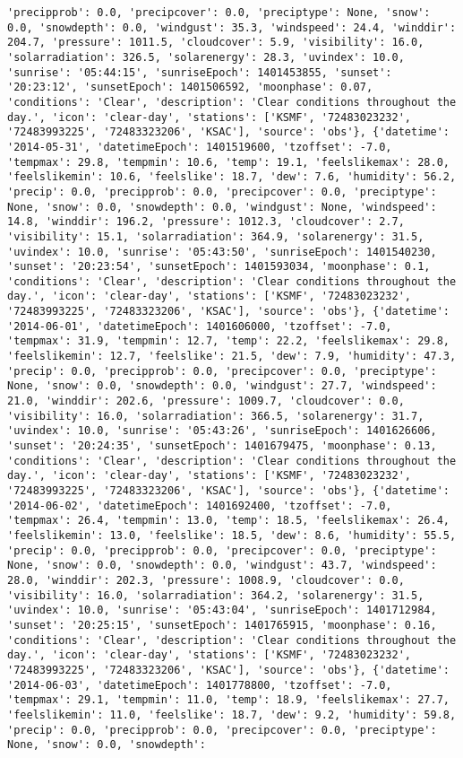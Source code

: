 \documentclass[
  letterpaper,
  DIV=11,
  numbers=noendperiod]{scrartcl}
\begin{document}
\begin{verbatim}
'precipprob': 0.0, 'precipcover': 0.0, 'preciptype': None, 'snow': 0.0, 'snowdepth': 0.0, 'windgust': 35.3, 'windspeed': 24.4, 'winddir': 204.7, 'pressure': 1011.5, 'cloudcover': 5.9, 'visibility': 16.0, 'solarradiation': 326.5, 'solarenergy': 28.3, 'uvindex': 10.0, 'sunrise': '05:44:15', 'sunriseEpoch': 1401453855, 'sunset': '20:23:12', 'sunsetEpoch': 1401506592, 'moonphase': 0.07, 'conditions': 'Clear', 'description': 'Clear conditions throughout the day.', 'icon': 'clear-day', 'stations': ['KSMF', '72483023232', '72483993225', '72483323206', 'KSAC'], 'source': 'obs'}, {'datetime': '2014-05-31', 'datetimeEpoch': 1401519600, 'tzoffset': -7.0, 'tempmax': 29.8, 'tempmin': 10.6, 'temp': 19.1, 'feelslikemax': 28.0, 'feelslikemin': 10.6, 'feelslike': 18.7, 'dew': 7.6, 'humidity': 56.2, 'precip': 0.0, 'precipprob': 0.0, 'precipcover': 0.0, 'preciptype': None, 'snow': 0.0, 'snowdepth': 0.0, 'windgust': None, 'windspeed': 14.8, 'winddir': 196.2, 'pressure': 1012.3, 'cloudcover': 2.7, 'visibility': 15.1, 'solarradiation': 364.9, 'solarenergy': 31.5, 'uvindex': 10.0, 'sunrise': '05:43:50', 'sunriseEpoch': 1401540230, 'sunset': '20:23:54', 'sunsetEpoch': 1401593034, 'moonphase': 0.1, 'conditions': 'Clear', 'description': 'Clear conditions throughout the day.', 'icon': 'clear-day', 'stations': ['KSMF', '72483023232', '72483993225', '72483323206', 'KSAC'], 'source': 'obs'}, {'datetime': '2014-06-01', 'datetimeEpoch': 1401606000, 'tzoffset': -7.0, 'tempmax': 31.9, 'tempmin': 12.7, 'temp': 22.2, 'feelslikemax': 29.8, 'feelslikemin': 12.7, 'feelslike': 21.5, 'dew': 7.9, 'humidity': 47.3, 'precip': 0.0, 'precipprob': 0.0, 'precipcover': 0.0, 'preciptype': None, 'snow': 0.0, 'snowdepth': 0.0, 'windgust': 27.7, 'windspeed': 21.0, 'winddir': 202.6, 'pressure': 1009.7, 'cloudcover': 0.0, 'visibility': 16.0, 'solarradiation': 366.5, 'solarenergy': 31.7, 'uvindex': 10.0, 'sunrise': '05:43:26', 'sunriseEpoch': 1401626606, 'sunset': '20:24:35', 'sunsetEpoch': 1401679475, 'moonphase': 0.13, 'conditions': 'Clear', 'description': 'Clear conditions throughout the day.', 'icon': 'clear-day', 'stations': ['KSMF', '72483023232', '72483993225', '72483323206', 'KSAC'], 'source': 'obs'}, {'datetime': '2014-06-02', 'datetimeEpoch': 1401692400, 'tzoffset': -7.0, 'tempmax': 26.4, 'tempmin': 13.0, 'temp': 18.5, 'feelslikemax': 26.4, 'feelslikemin': 13.0, 'feelslike': 18.5, 'dew': 8.6, 'humidity': 55.5, 'precip': 0.0, 'precipprob': 0.0, 'precipcover': 0.0, 'preciptype': None, 'snow': 0.0, 'snowdepth': 0.0, 'windgust': 43.7, 'windspeed': 28.0, 'winddir': 202.3, 'pressure': 1008.9, 'cloudcover': 0.0, 'visibility': 16.0, 'solarradiation': 364.2, 'solarenergy': 31.5, 'uvindex': 10.0, 'sunrise': '05:43:04', 'sunriseEpoch': 1401712984, 'sunset': '20:25:15', 'sunsetEpoch': 1401765915, 'moonphase': 0.16, 'conditions': 'Clear', 'description': 'Clear conditions throughout the day.', 'icon': 'clear-day', 'stations': ['KSMF', '72483023232', '72483993225', '72483323206', 'KSAC'], 'source': 'obs'}, {'datetime': '2014-06-03', 'datetimeEpoch': 1401778800, 'tzoffset': -7.0, 'tempmax': 29.1, 'tempmin': 11.0, 'temp': 18.9, 'feelslikemax': 27.7, 'feelslikemin': 11.0, 'feelslike': 18.7, 'dew': 9.2, 'humidity': 59.8, 'precip': 0.0, 'precipprob': 0.0, 'precipcover': 0.0, 'preciptype': None, 'snow': 0.0, 'snowdepth': 
\end{verbatim}
\end{document}
